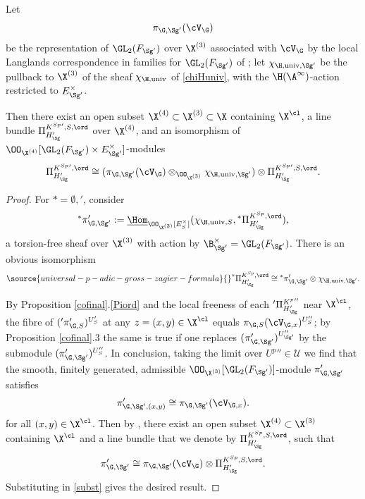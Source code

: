 \begin{theo}\label{LGC}
Let
$$\pi_{\G,{\Sg'}}(\cV_{\G})$$
be the representation of $\GL_{2}(F_{\Sg'})$ over $\X^{(3)}$ associated with $\cV_{\G}$ by the local Langlands correspondence in  families for $\GL_{2}(F_{{\Sg'}})$ of \cite{LLC};  let $\chi_{\H, {\rm univ}, {\Sg'}}$ be
 the pullback to $\X^{(3)}$ of the sheaf  $\chi_{\H, \rm univ}$  of \eqref{chiHuniv}, with the $\H(\A^{\infty})$-action restricted to $E_{{\Sg'}}^{\times}$.

Then there  exist an open subset $\X^{(4)}\subset \X^{ (3)}\subset \X$ containing $\X^{\cl}$,  a line bundle $ \Pi^{K^{Sp}{}',S,  \ord}_{{H_{\Sg}'}}$ over $\X^{ (4)}$, and an isomorphism of $\OO_{\X^{(4)}}[\GL_{2}(F_{{\Sg'}})\times E_{{\Sg'}}^{\times}]$-modules
$$
\Pi^{K^{{S}p}{}',  \ord}_{{{H_{\Sg}'}}}\cong
(
\pi_{\G,{\Sg'}}(\cV_{\G})\otimes_{\OO_{\X^{(3)}}} \chi_{\H, {\rm univ}, {\Sg'}}
)
  \otimes
  \Pi^{K^{{S}p}{}',{S},  \ord}_{{H_{\Sg}'}}. $$
\end{theo}
\begin{proof}
For $*=\emptyset, '$,  consider
$${}^{*}\pi_{\G, {\Sg'}}':=\underline{\Hom}_{\OO_{\X^{(3)}}[E_{S}^{ \times}]}  (\chi_{\H, {\rm univ},S}, {}^{*}\Pi^{K^{Sp}, \ord}_{{{H_{\Sg}'}}}),$$
a torsion-free sheaf over $\X^{(3)}$ with action by $\B_{{\Sg'}}^{\times}=\GL_{2}(F_{{\Sg'}})$. There is an obvious isomorphism
\begin{align}\label{subst}
\source{universal-p-adic-gross-zagier-formula}
{}^{*}\Pi^{K^{{S}p}, \ord}_{{H_{\Sg}'}} \cong {}^{*}\pi_{\G,{\Sg'}}'\otimes
 \chi_{\H, {\rm univ}, {\Sg'}}.
\end{align}


 By
 Proposition \ref{cofinal}.\ref{Piord}
 and the local freeness of  each
  ${}'\Pi^{K^{p}{}''}_{{H_{\Sg}'}}$ near $\X^{\cl}$, the fibre of
  $({}'\pi_{\G, S}')^{U_{S}'}$ at any $z=(x,y)\in \X^{\cl}$ equals   $\pi_{\G,S}(\cV_{\G,x})^{U_{S}''}$;    by Proposition \ref{cofinal}.3 the same is true if one replaces $({}^{}\pi'_{\G, {\Sg'}})^{U_{{\Sg'}}''}$ by the submodule $(\pi'_{\G, {\Sg'}})^{U_{S}''}$.
In conclusion, taking the limit over $U^{p}{}''\in \mathscr{U} $ we find that the smooth, finitely generated, admissible  $\OO_{\X^{(3)}}[\GL_{2}(F_{{\Sg'}})]$-module $\pi'_{\G,{\Sg'}}$ satisfies
$$\pi'_{\G,{\Sg'}, (x,y)}\cong \pi_{\G, {\Sg'}}(\cV_{\G,x}).
$$
for all $(x, y)\in \X^{\cl}$.
Then by \cite[Theorem  4.4.3]{LLC},  there exist an open subset $\X^{(4)}\subset \X^{(3)}$ containing $\X^{\cl} $ and  a line bundle that we denote by $ \Pi^{K^{Sp},S, \ord }_{{H_{\Sg}'}}$, such that
$$\pi'_{\G, {\Sg'}}\cong  \pi_{\G, {\Sg'}}(\cV_{\G})\otimes \Pi^{K^{Sp},S, \ord}_{{H_{\Sg}'}}.$$
Substituting in \eqref{subst} gives the desired result.
\end{proof}
